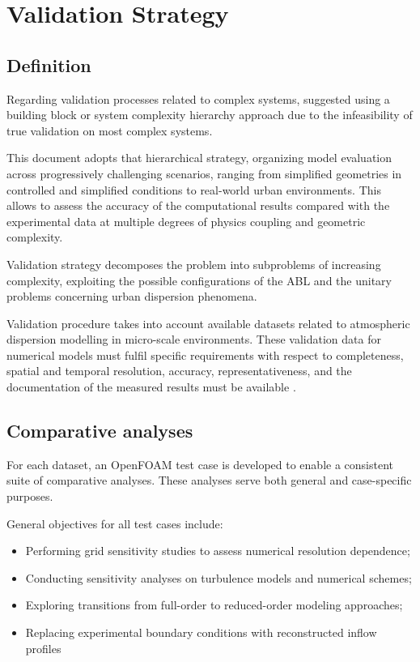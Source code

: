 \section{Validation Strategy}

\subsection{Definition}
Regarding validation processes related to complex systems, \textcite{Oberkampf2010} suggested using a building block or system complexity hierarchy approach due to the infeasibility of true validation on most complex systems. 

This document adopts that hierarchical strategy, organizing model evaluation across progressively challenging scenarios, ranging from simplified geometries in controlled and simplified conditions to real-world urban environments. This allows to assess the accuracy of the computational results compared with the experimental data at multiple degrees of physics coupling and geometric complexity.\newline

Validation strategy decomposes the problem into subproblems of increasing complexity, exploiting the possible configurations of the ABL and the unitary problems concerning urban dispersion phenomena.\newline

Validation procedure takes into account available datasets related to atmospheric dispersion modelling in micro-scale environments. These validation data for numerical models must fulfil specific requirements with respect to completeness, spatial and temporal resolution, accuracy, representativeness, and the documentation of the measured results must be available \parencite{Chang2003}.

\subsection{Comparative analyses}

For each dataset, an OpenFOAM test case is developed to enable a consistent suite of comparative analyses. These analyses serve both general and case-specific purposes.\newline

\noindent
General objectives for all test cases include:
\begin{itemize}
    \item Performing grid sensitivity studies to assess numerical resolution dependence;
    \item Conducting sensitivity analyses on turbulence models and numerical schemes;
    \item Exploring transitions from full-order to reduced-order modeling approaches;
    \item Replacing experimental boundary conditions with reconstructed inflow profiles
\end{itemize}


